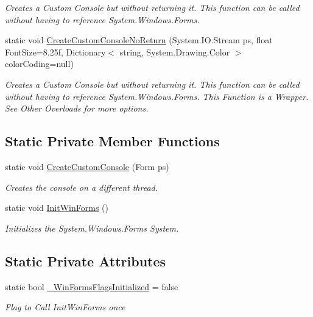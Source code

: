 \begin{DoxyCompactItemize}
\begin{DoxyCompactList}\small\item\em Creates a Custom Console but without returning it. This function can be called without having to reference System.\+Windows.\+Forms. \end{DoxyCompactList}\item 
static void \mbox{\hyperlink{class_a_d_l_1_1_custom_c_m_d_1_1_c_m_d_utils_a7700a2c5505d3160e33b70fdde89639b}{Create\+Custom\+Console\+No\+Return}} (System.\+I\+O.\+Stream ps, float Font\+Size=8.\+25f, Dictionary$<$ string, System.\+Drawing.\+Color $>$ color\+Coding=null)
\begin{DoxyCompactList}\small\item\em Creates a Custom Console but without returning it. This function can be called without having to reference System.\+Windows.\+Forms. This Function is a Wrapper. See Other Overloads for more options. \end{DoxyCompactList}\end{DoxyCompactItemize}
\subsection*{Static Private Member Functions}
\begin{DoxyCompactItemize}
\item 
static void \mbox{\hyperlink{class_a_d_l_1_1_custom_c_m_d_1_1_c_m_d_utils_acbeeed9b5a8118efb0c6cac62b360bc8}{Create\+Custom\+Console}} (Form ps)
\begin{DoxyCompactList}\small\item\em Creates the console on a different thread. \end{DoxyCompactList}\item 
static void \mbox{\hyperlink{class_a_d_l_1_1_custom_c_m_d_1_1_c_m_d_utils_a9c23ebff134d2a647fb4e4a5b9bc826b}{Init\+Win\+Forms}} ()
\begin{DoxyCompactList}\small\item\em Initializes the System.\+Windows.\+Forms System. \end{DoxyCompactList}\end{DoxyCompactItemize}
\subsection*{Static Private Attributes}
\begin{DoxyCompactItemize}
\item 
static bool \mbox{\hyperlink{class_a_d_l_1_1_custom_c_m_d_1_1_c_m_d_utils_a146849b04a89ae31e86ae3fe959e98f5}{\+\_\+\+Win\+Forms\+Flags\+Initialized}} = false
\begin{DoxyCompactList}\small\item\em Flag to Call Init\+Win\+Forms once \end{DoxyCompactList}\end{DoxyCompactItemize}


